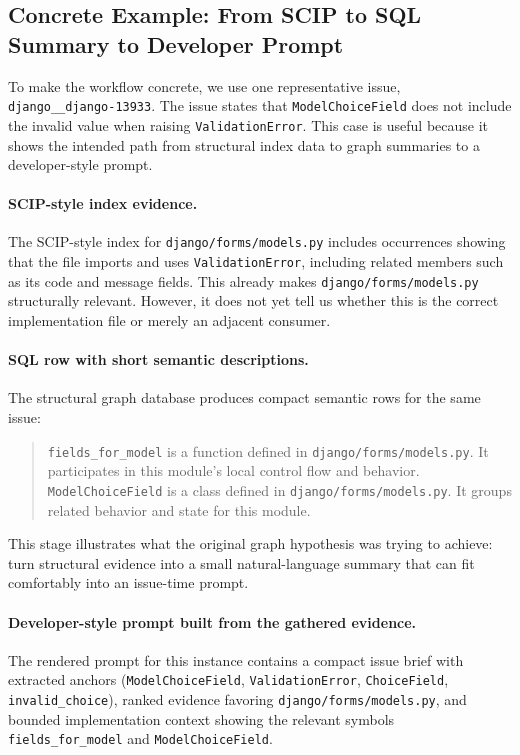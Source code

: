\documentclass[11pt]{article}
\begin{document}
\subsection{Concrete Example: From SCIP to SQL Summary to Developer Prompt}

To make the workflow concrete, we use one representative issue, \texttt{django\_\_django-13933}. The issue states that \texttt{ModelChoiceField} does not include the invalid value when raising \texttt{ValidationError}. This case is useful because it shows the intended path from structural index data to graph summaries to a developer-style prompt.

\paragraph{SCIP-style index evidence.}
The SCIP-style index for \texttt{django/forms/models.py} includes occurrences showing that the file imports and uses \texttt{ValidationError}, including related members such as its code and message fields. This already makes \texttt{django/forms/models.py} structurally relevant. However, it does not yet tell us whether this is the correct implementation file or merely an adjacent consumer.

\paragraph{SQL row with short semantic descriptions.}
The structural graph database produces compact semantic rows for the same issue:

\begin{quote}
\small
\texttt{fields\_for\_model} is a function defined in \texttt{django/forms/models.py}. It participates in this module's local control flow and behavior.\\
\texttt{ModelChoiceField} is a class defined in \texttt{django/forms/models.py}. It groups related behavior and state for this module.
\end{quote}

This stage illustrates what the original graph hypothesis was trying to achieve: turn structural evidence into a small natural-language summary that can fit comfortably into an issue-time prompt.

\paragraph{Developer-style prompt built from the gathered evidence.}
The rendered prompt for this instance contains a compact issue brief with extracted anchors (\texttt{ModelChoiceField}, \texttt{ValidationError}, \texttt{ChoiceField}, \texttt{invalid\_choice}), ranked evidence favoring \texttt{django/forms/models.py}, and bounded implementation context showing the relevant symbols \texttt{fields\_for\_model} and \texttt{ModelChoiceField}.
\end{document}
